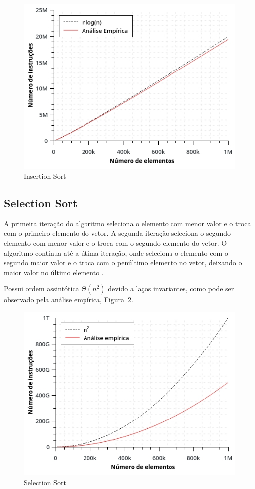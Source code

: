 \begin{figure}[ht]
\centering
\includegraphics[scale=0.7]{images/insertion_graph.jpg}
\caption{Insertion Sort}
\label{fig:insertion}
\end{figure}
 
\subsection{Selection Sort}
A primeira iteração do algoritmo seleciona o elemento com menor valor e o troca com o primeiro elemento do vetor. A segunda iteração seleciona o segundo elemento com menor valor e o troca com o segundo elemento do vetor. O algoritmo continua até a útima iteração, onde seleciona o elemento com o segundo maior valor e o troca com o penúltimo elemento no vetor, deixando o maior valor no último elemento \cite{deitel:01}.

Possui ordem assintótica $\Theta(n^2)$ devido a laços invariantes, como pode ser observado pela análise empírica, Figura~\ref{fig:selection}.
\begin{figure}[ht]
\centering
\includegraphics[scale=0.7]{images/selection_graph.jpg}
\caption{Selection Sort}
\label{fig:selection}
\end{figure}

